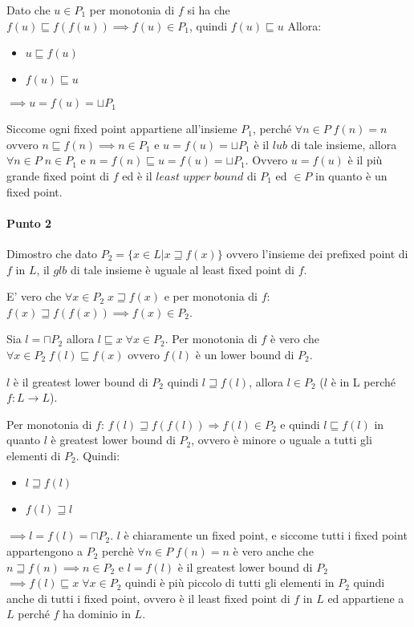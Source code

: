 \documentclass{article}
\newcommand{\pd}{P_{2}}
\begin{document}
Dato che $u \in P_{1}$ per monotonia di $f$ si ha che $f(u)\sqsubseteq f(f(u)) \implies f(u) \in P_{1}$, quindi $f(u)\sqsubseteq u$ Allora:
\begin{itemize}
    \item $u\sqsubseteq f(u)$
    \item $f(u)\sqsubseteq u$
\end{itemize}
$\implies u=f(u)=\sqcup P_{1}$

Siccome ogni fixed point appartiene all'insieme $P_{1}$, perché $\forall n \in P \; f(n)=n $ ovvero $n \sqsubseteq f(n) \implies n \in P_{1}$ e $u=f(u)=\sqcup P_{1}$ è il $lub$ di tale insieme, allora $\forall n \in P \; n \in P_{1} $ e $n = f(n) \sqsubseteq u = f(u) =\sqcup P_{1}$. Ovvero $u=f(u)$  è il più grande fixed point di $f$ ed è il $least\; upper\; bound$ di $P_{1}$ ed $\in P$ in quanto è un fixed point. 

\paragraph{Punto 2} Dimostro che dato $\pd = \{x \in L | x \sqsupseteq f(x) \}$ ovvero l'insieme dei prefixed point di $f$ in $L$, il $glb$ di tale insieme è uguale al least fixed point di $f$.

E' vero che $\forall x \in \pd \; x \sqsupseteq f(x)$ e per monotonia di $f$: $f(x) \sqsupseteq f(f(x)) \implies f(x) \in \pd$.

Sia $l = \sqcap \pd $ allora $l \sqsubseteq x \; \forall x \in \pd$. Per monotonia di $f$ è vero che $\forall x \in \pd \; f(l) \sqsubseteq f(x)$ ovvero $f(l)$ è un lower bound di $\pd$.

$l$ è il greatest lower bound di $\pd$ quindi $l \sqsupseteq f(l) $, allora $l \in \pd$ ($l$ è in L perché $f:L\to L$).

Per monotonia di $f$: $f(l) \sqsupseteq f(f(l)) \Rightarrow f(l) \in \pd$ e quindi $l\sqsubseteq f(l)$ in quanto $l$ è greatest lower bound di $\pd$, ovvero è minore o uguale a tutti gli elementi di $\pd$. Quindi:
\begin{itemize}
    \item $l\sqsupseteq f(l)$
    \item $f(l) \sqsupseteq l$
\end{itemize}
$\implies l = f(l) = \sqcap \pd $. $ l $ è chiaramente un fixed point, e siccome tutti i fixed point appartengono a $ \pd $ perchè $ \forall n \in P \; f(n) = n $ è vero anche che $ n \sqsupseteq f(n) \implies n \in P_{2} $ e $l=f(l)$ è il greatest lower bound di $\pd$ $\implies f(l) \sqsubseteq x \; \forall x \in \pd $ quindi è più piccolo di tutti gli elementi in $\pd$ quindi anche di tutti i fixed point, ovvero è il least fixed point di $f$ in $L$ ed appartiene a $L$ perché $f$ ha dominio in $L$.
\end{document}
